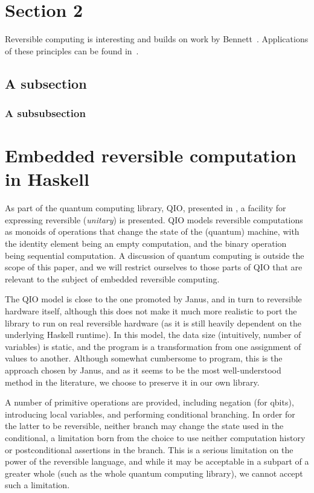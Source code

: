 \documentclass[10pt]{sigplanconf}
\begin{document}
\section{Section 2}
Reversible computing is interesting and builds on work by Bennett~\cite{Bennett:1982}. Applications of these principles can be found in~\cite{ThomsenAxelsen:2009:PPL,YokoyamaGlueck:2007:Janus}.

\subsection{A subsection}


\subsubsection{A subsubsection}

\section{Embedded reversible computation in Haskell}

As part of the quantum computing library, QIO, presented in
\cite{altenkirchquantum}, a facility for expressing reversible
(\textit{unitary}) is presented.  QIO models reversible computations
as monoids of operations that change the state of the (quantum)
machine, with the identity element being an empty computation, and the
binary operation being sequential computation.  A discussion of
quantum computing is outside the scope of this paper, and we will
restrict ourselves to those parts of QIO that are relevant to the
subject of embedded reversible computing.

The QIO model is close to the one promoted by Janus, and in turn to
reversible hardware itself, although this does not make it much more
realistic to port the library to run on real reversible hardware (as
it is still heavily dependent on the underlying Haskell runtime).  In
this model, the data size (intuitively, number of variables) is
static, and the program is a transformation from one assignment of
values to another.  Although somewhat cumbersome to program, this is
the approach chosen by Janus, and as it seems to be the most
well-understood method in the literature, we choose to preserve it in
our own library.

A number of primitive operations are provided, including negation (for
qbits), introducing local variables, and performing conditional
branching.  In order for the latter to be reversible, neither branch
may change the state used in the conditional, a limitation born from
the choice to use neither computation history or postconditional
assertions in the branch.  This is a serious limitation on the power
of the reversible language, and while it may be acceptable in a
subpart of a greater whole (such as the whole quantum computing
library), we cannot accept such a limitation.
\end{document}
